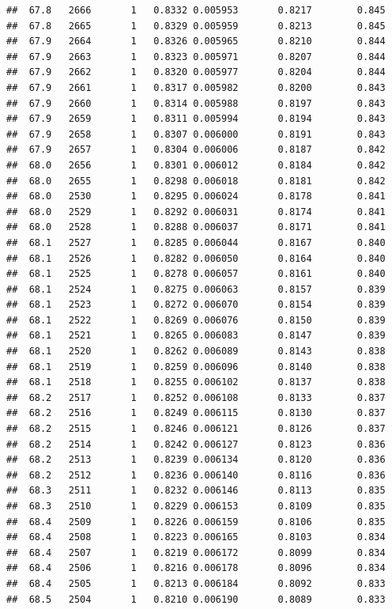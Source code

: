 \documentclass[
]{book}
\begin{document}
\begin{verbatim}
##  67.8   2666       1   0.8332 0.005953       0.8217        0.845
##  67.8   2665       1   0.8329 0.005959       0.8213        0.845
##  67.9   2664       1   0.8326 0.005965       0.8210        0.844
##  67.9   2663       1   0.8323 0.005971       0.8207        0.844
##  67.9   2662       1   0.8320 0.005977       0.8204        0.844
##  67.9   2661       1   0.8317 0.005982       0.8200        0.843
##  67.9   2660       1   0.8314 0.005988       0.8197        0.843
##  67.9   2659       1   0.8311 0.005994       0.8194        0.843
##  67.9   2658       1   0.8307 0.006000       0.8191        0.843
##  67.9   2657       1   0.8304 0.006006       0.8187        0.842
##  68.0   2656       1   0.8301 0.006012       0.8184        0.842
##  68.0   2655       1   0.8298 0.006018       0.8181        0.842
##  68.0   2530       1   0.8295 0.006024       0.8178        0.841
##  68.0   2529       1   0.8292 0.006031       0.8174        0.841
##  68.0   2528       1   0.8288 0.006037       0.8171        0.841
##  68.1   2527       1   0.8285 0.006044       0.8167        0.840
##  68.1   2526       1   0.8282 0.006050       0.8164        0.840
##  68.1   2525       1   0.8278 0.006057       0.8161        0.840
##  68.1   2524       1   0.8275 0.006063       0.8157        0.839
##  68.1   2523       1   0.8272 0.006070       0.8154        0.839
##  68.1   2522       1   0.8269 0.006076       0.8150        0.839
##  68.1   2521       1   0.8265 0.006083       0.8147        0.839
##  68.1   2520       1   0.8262 0.006089       0.8143        0.838
##  68.1   2519       1   0.8259 0.006096       0.8140        0.838
##  68.1   2518       1   0.8255 0.006102       0.8137        0.838
##  68.2   2517       1   0.8252 0.006108       0.8133        0.837
##  68.2   2516       1   0.8249 0.006115       0.8130        0.837
##  68.2   2515       1   0.8246 0.006121       0.8126        0.837
##  68.2   2514       1   0.8242 0.006127       0.8123        0.836
##  68.2   2513       1   0.8239 0.006134       0.8120        0.836
##  68.2   2512       1   0.8236 0.006140       0.8116        0.836
##  68.3   2511       1   0.8232 0.006146       0.8113        0.835
##  68.3   2510       1   0.8229 0.006153       0.8109        0.835
##  68.4   2509       1   0.8226 0.006159       0.8106        0.835
##  68.4   2508       1   0.8223 0.006165       0.8103        0.834
##  68.4   2507       1   0.8219 0.006172       0.8099        0.834
##  68.4   2506       1   0.8216 0.006178       0.8096        0.834
##  68.4   2505       1   0.8213 0.006184       0.8092        0.833
##  68.5   2504       1   0.8210 0.006190       0.8089        0.833

\end{verbatim}
\end{document}
